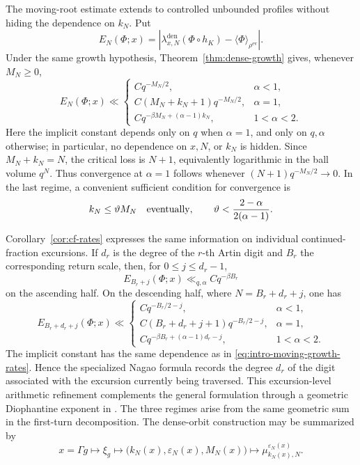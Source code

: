 \documentclass[11pt]{amsart}
\theoremstyle{definition}
\theoremstyle{plain}
\newcommand{\ev}{\mathrm{ev}}
\newcommand{\ang}{\langle}
\newcommand{\rang}{\rangle}
\begin{document}
The moving-root estimate extends to controlled unbounded profiles without
hiding the dependence on \(k_N\).  Put
\[
E_N(\Phi;x)=
\left|\lambda_{x,N}^{\mathrm{den}}(\Phi\circ h_K)
      -\ang\Phi\rang_{\rho^{\ev}}\right|.
\]
Under the same growth hypothesis, Theorem~\ref{thm:dense-growth} gives,
whenever \(M_N\ge0\),
\begin{equation}\label{eq:intro-moving-growth-rates}
E_N(\Phi;x)\ll
\begin{cases}
Cq^{-M_N/2},&\alpha<1,\\
C(M_N+k_N+1)q^{-M_N/2},&\alpha=1,\\
Cq^{-\beta M_N+(\alpha-1)k_N},&1<\alpha<2.
\end{cases}
\end{equation}
Here the implicit constant depends only on \(q\) when \(\alpha=1\), and only on
\(q,\alpha\) otherwise; in particular, no dependence on \(x,N\), or \(k_N\) is
hidden.  Since \(M_N+k_N=N\), the critical loss is \(N+1\), equivalently
logarithmic in the ball volume \(q^N\).  Thus convergence at \(\alpha=1\)
follows whenever \((N+1)q^{-M_N/2}\to0\).  In the last regime, a convenient
sufficient condition for convergence is
\[
k_N\le\vartheta M_N\quad\hbox{eventually},
\qquad
\vartheta<\frac{2-\alpha}{2(\alpha-1)}.
\]

Corollary~\ref{cor:cf-rates} expresses the same information on individual
continued-fraction excursions.  If \(d_r\) is the degree of the \(r\)-th Artin
digit and \(B_r\) the corresponding return scale, then, for
\(0\le j\le d_r-1\),
\begin{equation}\label{eq:intro-cf-rates}
E_{B_r+j}(\Phi;x)\ll_{q,\alpha}Cq^{-\beta B_r}
\end{equation}
on the ascending half.  On the descending half, where
\(N=B_r+d_r+j\), one has
\begin{equation}\label{eq:intro-cf-descending-rate}
E_{B_r+d_r+j}(\Phi;x)\ll
\begin{cases}
Cq^{-B_r/2-j},&\alpha<1,\\
C(B_r+d_r+j+1)q^{-B_r/2-j},&\alpha=1,\\
Cq^{-\beta B_r+(\alpha-1)d_r-j},&1<\alpha<2.
\end{cases}
\end{equation}
The implicit constant has the same dependence as in
\eqref{eq:intro-moving-growth-rates}.  Hence the specialized Nagao formula
records the degree \(d_r\) of the digit associated with the excursion currently
being traversed.  This excursion-level arithmetic refinement complements the
general formulation through a geometric Diophantine exponent in
\cite{CFS2022}.  The three regimes arise from the same geometric sum in the
first-turn decomposition.  The dense-orbit construction may be summarized by
\[
x=\Gamma g\longmapsto \xi_g
 \longmapsto \bigl(k_N(x),\varepsilon_N(x),M_N(x)\bigr)
 \longmapsto \mu^{\varepsilon_N(x)}_{k_N(x),N}.
\]
\end{document}

